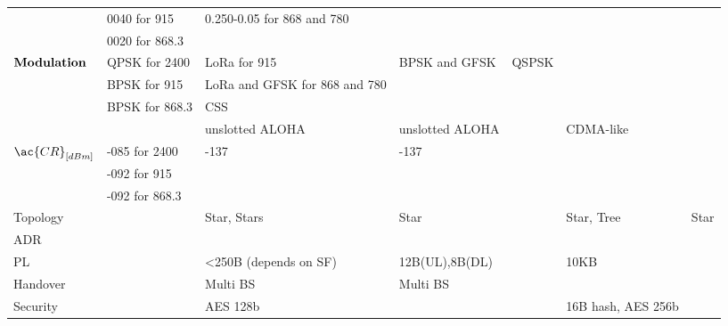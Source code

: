 \begin{table}[!ht]
\begin{tabulary}{\textwidth}{L|L|L|L|L|L|L}
	\                                  & 0040 for 915   & 0.250-0.05     for 868 and 780  &               &             &                 &                 \\
	\                                  & 0020 for 868.3 &                                 &               &             &                 &                 \\\hline
	 & QPSK for 2400  & LoRa           for 915          & BPSK and GFSK & QSPSK       &                 &                 \\
	\                                  & BPSK for 915   & LoRa and GFSK  for 868  and 780 &               &             &                 &                 \\
	\                                  & BPSK for 868.3 & \ac{CSS}                        &               &             &                 &                 \\
	\                                  &                & unslotted ALOHA                 &unslotted ALOHA&             & CDMA-like       &                 \\\hline
	 & -085 for 2400  & -137                            & -137          &             &                 &                 \\
	\                                  & -092 for 915   &                                 &               &             &                 &                 \\
	\                                  & -092 for 868.3 &                                 &               &             &                 &                 \\\hline
	Topology                           &                & Star, Stars                     & Star          &             & Star, Tree      & Star            \\\hline
	\ac{ADR}                           &                &       \ok                       & \ko           &             & \ok             & \ko             \\\hline
	\ac{PL}                            &                & <250B (depends on SF)           & 12B(UL),8B(DL)&             & 10KB            &                 \\\hline
	Handover                           &                & Multi \ac{BS}                   & Multi \ac{BS} &             &                 &                 \\\hline
	Security                           &                & AES 128b                        & \ko           &             & 16B hash, AES 256b&               \\\hline

\end{tabulary}
\end{table}
